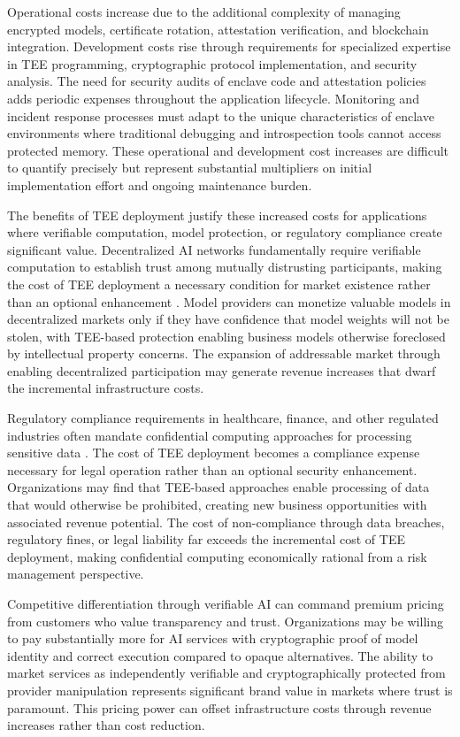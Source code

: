 Operational costs increase due to the additional complexity of managing encrypted models, certificate rotation, attestation verification, and blockchain integration. Development costs rise through requirements for specialized expertise in TEE programming, cryptographic protocol implementation, and security analysis. The need for security audits of enclave code and attestation policies adds periodic expenses throughout the application lifecycle. Monitoring and incident response processes must adapt to the unique characteristics of enclave environments where traditional debugging and introspection tools cannot access protected memory. These operational and development cost increases are difficult to quantify precisely but represent substantial multipliers on initial implementation effort and ongoing maintenance burden.

The benefits of TEE deployment justify these increased costs for applications where verifiable computation, model protection, or regulatory compliance create significant value. Decentralized AI networks fundamentally require verifiable computation to establish trust among mutually distrusting participants, making the cost of TEE deployment a necessary condition for market existence rather than an optional enhancement \cite{confidential_computing}. Model providers can monetize valuable models in decentralized markets only if they have confidence that model weights will not be stolen, with TEE-based protection enabling business models otherwise foreclosed by intellectual property concerns. The expansion of addressable market through enabling decentralized participation may generate revenue increases that dwarf the incremental infrastructure costs.

Regulatory compliance requirements in healthcare, finance, and other regulated industries often mandate confidential computing approaches for processing sensitive data \cite{gdpr_compliance, hipaa_security}. The cost of TEE deployment becomes a compliance expense necessary for legal operation rather than an optional security enhancement. Organizations may find that TEE-based approaches enable processing of data that would otherwise be prohibited, creating new business opportunities with associated revenue potential. The cost of non-compliance through data breaches, regulatory fines, or legal liability far exceeds the incremental cost of TEE deployment, making confidential computing economically rational from a risk management perspective.

Competitive differentiation through verifiable AI can command premium pricing from customers who value transparency and trust. Organizations may be willing to pay substantially more for AI services with cryptographic proof of model identity and correct execution compared to opaque alternatives. The ability to market services as independently verifiable and cryptographically protected from provider manipulation represents significant brand value in markets where trust is paramount. This pricing power can offset infrastructure costs through revenue increases rather than cost reduction.

